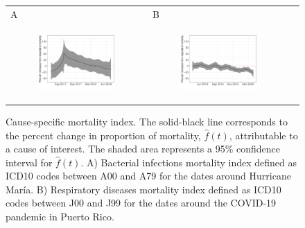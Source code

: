 \documentclass[11pt]{article}
\begin{document}
\begin{figure}[ht]
	\begin{tabular}{lll}
	A&B\\
	\begin{subfigure}[t]{0.49\linewidth}
		\centering
		\includegraphics[width=1\linewidth]{figs/figure-4a.pdf} 
	\end{subfigure}&
	\begin{subfigure}[t]{0.49\linewidth}
		\centering
		\includegraphics[width=1\linewidth]{figs/figure-4b.pdf}
	\end{subfigure}&\\
    \end{tabular}
	\caption{Cause-specific mortality index. The solid-black line corresponds to the percent change in proportion of mortality, $\hat{f}(t)$, attributable to a cause of interest. The shaded area represents a 95\% confidence interval for $\hat{f}(t)$. A) Bacterial infections mortality index defined as ICD10 codes between A00 and A79 for the dates around Hurricane Mar\'ia. B) Respiratory diseases mortality index defined as ICD10 codes between J00 and J99 for the dates around the COVID-19 pandemic in Puerto Rico.}
	\label{fig:mortality-index}
\end{figure}
\end{document}
